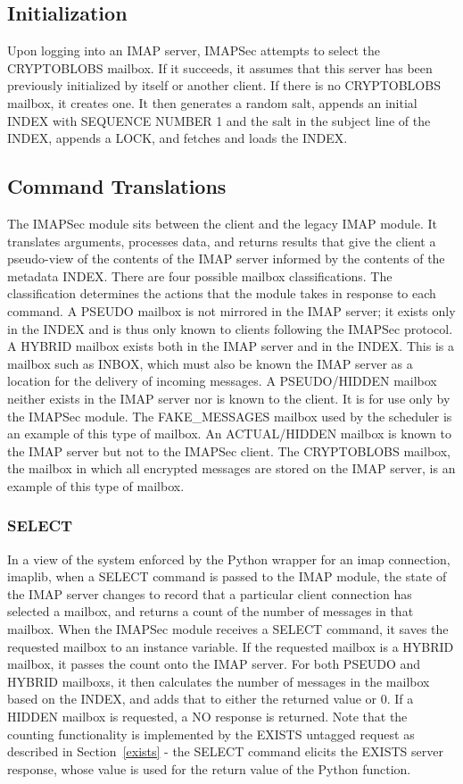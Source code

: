 \documentclass[pageno]{jpaper}
\newcommand{\project}{IMAPSec }
\begin{document}
\label{initialization}
\subsection{Initialization}
Upon logging into an IMAP server, \project attempts to select the CRYPTOBLOBS mailbox. If it succeeds, it assumes that this server has been previously initialized by itself or another client. If there is no CRYPTOBLOBS mailbox, it creates one. It then generates a random salt, appends an initial INDEX with SEQUENCE NUMBER 1 and the salt in the subject line of the INDEX, appends a LOCK, and fetches and loads the INDEX.

\subsection{Command Translations}
The \project module sits between the client and the legacy IMAP module. It translates arguments, processes data, and returns results that give the client a pseudo-view of the contents of the IMAP server informed by the contents of the metadata INDEX. There are four possible mailbox classifications. The classification determines the actions that the module takes in response to each command. A PSEUDO mailbox is not mirrored in the IMAP server; it exists only in the INDEX and is thus only known to clients following the \project protocol. A HYBRID mailbox exists both in the IMAP server and in the INDEX. This is a mailbox such as INBOX, which must also be known the IMAP server as a location for the delivery of incoming messages. A PSEUDO/HIDDEN mailbox neither exists in the IMAP server nor is known to the client. It is for use only by the \project module. The FAKE\_MESSAGES mailbox used by the scheduler is an example of this type of mailbox. An ACTUAL/HIDDEN mailbox is known to the IMAP server but not to the \project client. The CRYPTOBLOBS mailbox, the mailbox in which all encrypted messages are stored on the IMAP server, is an example of this type of mailbox. 

\label{select}
\subsubsection{SELECT} In a view of the system enforced by the Python wrapper for an imap connection, imaplib, when a SELECT command is passed to the IMAP module, the state of the IMAP server changes to record that a particular client connection has selected a mailbox, and returns a count of the number of messages in that mailbox. When the \project module receives a SELECT command, it saves the requested mailbox to an instance variable. If the requested mailbox is a HYBRID mailbox, it passes the count onto the IMAP server. For both PSEUDO and HYBRID mailboxs, it then calculates the number of messages in the mailbox based on the INDEX, and adds that to either the returned value or 0. If a HIDDEN mailbox is requested, a NO response is returned. Note that the counting functionality is implemented by the EXISTS untagged request as described in Section~\ref{exists} - the SELECT command elicits the EXISTS server response, whose value is used for the return value of the Python function.
\end{document}
